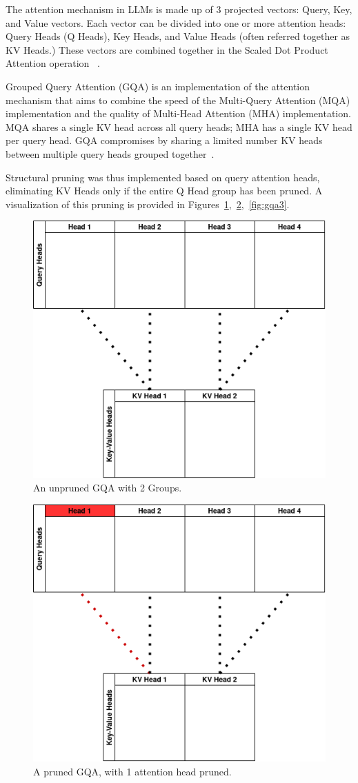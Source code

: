 \documentclass[conference]{IEEEtran}
\begin{document}
    The attention mechanism in LLMs is made up of 3 projected vectors: Query, Key, and Value vectors.
    Each vector can be divided into one or more attention heads: Query Heads (Q Heads), Key Heads, and Value Heads
    (often referred together as KV Heads.)
    These vectors are combined together in the Scaled Dot Product Attention operation ~\cite{vaswani2023attentionneed}.

    Grouped Query Attention (GQA) is an implementation of the attention mechanism that aims to combine the speed of
    the Multi-Query Attention (MQA) implementation and the quality of Multi-Head Attention (MHA) implementation.
    MQA shares a single KV head across all query heads; MHA has a single KV head per query head.
    GQA compromises by sharing a limited number KV heads between multiple query heads grouped together~\cite{ainslie2023gqatraininggeneralizedmultiquery}.

    Structural pruning was thus implemented based on query attention heads, eliminating KV Heads only if the entire Q Head group has been pruned.
    A visualization of this pruning is provided in Figures~\ref{fig:gqa1},~\ref{fig:gqa2},~\ref{fig:gqa3}.

    \begin{figure}[!htbp]
        \centerline{\includegraphics[width=0.66\columnwidth]{Unpruned GQA}}
        \caption{An unpruned GQA with 2 Groups.}
        \label{fig:gqa1}
    \end{figure}

    \begin{figure}[!htbp]
        \centerline{\includegraphics[width=0.66\columnwidth]{Pruned GQA 1}}
        \caption{A pruned GQA, with 1 attention head pruned.}
        \label{fig:gqa2}
    \end{figure}
\end{document}
